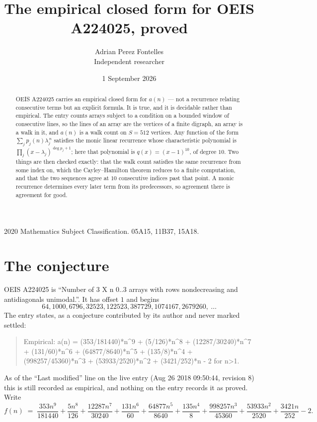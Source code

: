 \documentclass[11pt,a4paper]{article}
\title{The empirical closed form for OEIS A224025, proved}
\author{Adrian Perez Fontelles\\ \small Independent researcher}
\date{1 September 2026}
\theoremstyle{plain}
\theoremstyle{definition}
\begin{document}
\maketitle

\begin{abstract}
OEIS A224025 carries an empirical closed form for $a(n)$ --- not a recurrence relating
consecutive terms but an explicit formula. It is true, and it is decidable rather than
empirical. The entry counts arrays subject to a condition on a bounded window of consecutive lines, so the lines of an array are the
vertices of a finite digraph, an array is a walk in it, and $a(n)$ is a walk count on
$S=512$ vertices. Any function of the form $\sum_j p_j(n)\lambda_j^{\,n}$ satisfies the
monic linear recurrence whose characteristic polynomial is
$\prod_j(x-\lambda_j)^{\deg p_j+1}$; here that polynomial is $q(x)=(x-1)^{10}$, of degree
$10$. Two things are then checked exactly: that the walk count satisfies the same
recurrence from some index on, which the Cayley--Hamilton theorem reduces to a finite
computation, and that the two sequences agree at $10$ consecutive indices past that
point. A monic recurrence determines every later term from its predecessors, so agreement
there is agreement for good.
\end{abstract}

\noindent\small 2020 Mathematics Subject Classification. 05A15, 11B37, 15A18.\normalsize

\section{The conjecture}

OEIS A224025 is ``Number of 3 X n 0..3 arrays with rows nondecreasing and antidiagonals unimodal.''. It has offset $1$ and begins
\[
64, 1000, 6796, 32523, 122523, 387729, 1074167, 2679260,\ \dots
\]
The entry states, as a conjecture contributed by its author and never marked settled:
\begin{quote}
Empirical: a(n) = (353/181440)*n\^{}9 + (5/126)*n\^{}8 + (12287/30240)*n\^{}7 + (131/60)*n\^{}6 + (64877/8640)*n\^{}5 + (135/8)*n\^{}4 + (998257/45360)*n\^{}3 + (53933/2520)*n\^{}2 + (3421/252)*n - 2 for n>1.
\end{quote}
As of the ``Last modified'' line on the live entry (Aug 26 2018 09:50:44, revision 8) this is still
recorded as empirical, and nothing on the entry records it as proved. Write
\[
f(n)\;=\;\frac{353 n^{9}}{181440} + \frac{5 n^{8}}{126} + \frac{12287 n^{7}}{30240} + \frac{131 n^{6}}{60} + \frac{64877 n^{5}}{8640} + \frac{135 n^{4}}{8} + \frac{998257 n^{3}}{45360} + \frac{53933 n^{2}}{2520} + \frac{3421 n}{252} - 2.
\]
\end{document}
